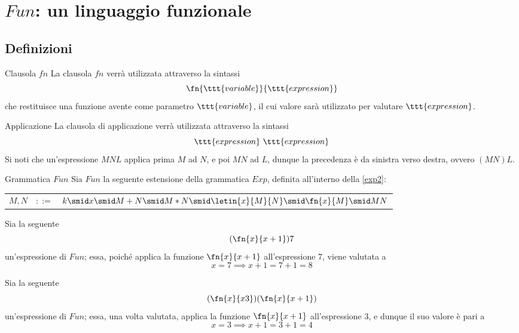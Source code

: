 \documentclass[a4paper, 12pt]{report}
\begin{document}
    \section{$Fun$: un linguaggio funzionale}

    \subsection{Definizioni}

    \begin{frameddefn}[label={fn}]{Clausola $fn$}
        La clausola $fn$ verrà utilizzata attraverso la sintassi $$\fn{\ttt{variable}}{\ttt{expression}}$$ che restituisce una funzione avente come parametro $\ttt{variable}$, il cui valore sarà utilizzato per valutare $\ttt{expression}$.
    \end{frameddefn}

    \begin{frameddefn}{Applicazione}
        La clausola di applicazione verrà utilizzata attraverso la sintassi $$\ttt{expression} \ \ttt{expression}$$ Si noti che un'espressione $MNL$ applica prima $M$ ad $N$, e poi $MN$ ad $L$, dunque la precedenza è da sinistra verso destra, ovvero $(MN)L$.
    \end{frameddefn}

    \begin{frameddefn}[label={fun}]{Grammatica $Fun$}
        Sia $Fun$ la seguente estensione della grammatica $Exp$, definita all'interno della \cref{exp2}:

        \begin{center}
            \begin{tabular}{rcl}
                $M, N$ & $::=$ & $k \smid x \smid M + N \smid M * N \smid \letin{x}{M}{N} \smid \fn{x}{M} \smid MN$ \\
            \end{tabular}
        \end{center}
    \end{frameddefn}

    \begin{example}
        Sia la seguente $$(\fn{x}{x +1})7$$ un'espressione di $Fun$; essa, poiché applica la funzione $\fn{x}{x+1}$ all'espressione 7, viene valutata a $$x = 7 \implies x + 1= 7 + 1 = 8$$
    \end{example}

    \begin{example}
        \label{expr fun}
        Sia la seguente $$(\fn{x}{x3})(\fn{x}{x+1})$$ un'espressione di $Fun$; essa, una volta valutata, applica la funzione $\fn{x}{x+1}$ all'espressione 3, e dunque il suo valore è pari a $$x = 3 \implies x + 1 = 3 + 1 = 4$$
    \end{example}
\end{document}
